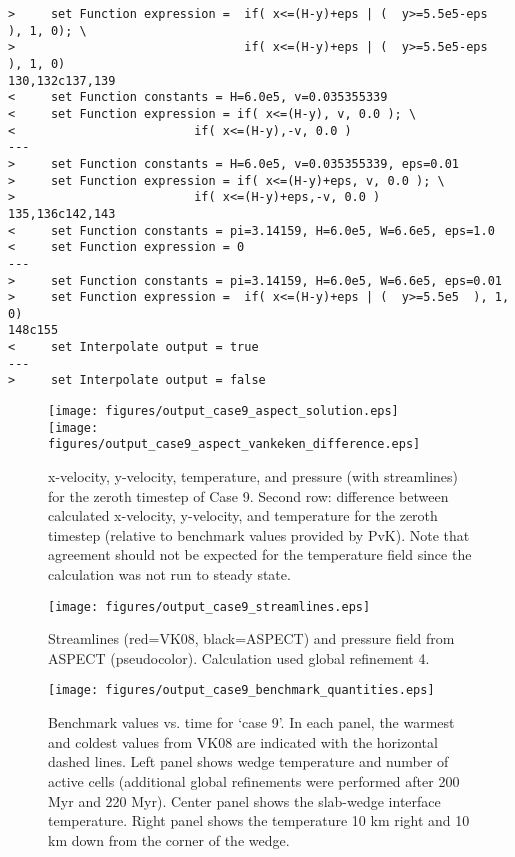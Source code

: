 \documentclass[11pt,letterpaper]{article}
\begin{document}
\begin{verbatim}
>     set Function expression =  if( x<=(H-y)+eps | (  y>=5.5e5-eps  ), 1, 0); \
>                                if( x<=(H-y)+eps | (  y>=5.5e5-eps  ), 1, 0)
130,132c137,139
<     set Function constants = H=6.0e5, v=0.035355339
<     set Function expression = if( x<=(H-y), v, 0.0 ); \
< 	      	              if( x<=(H-y),-v, 0.0 )
---
>     set Function constants = H=6.0e5, v=0.035355339, eps=0.01
>     set Function expression = if( x<=(H-y)+eps, v, 0.0 ); \
> 	      	              if( x<=(H-y)+eps,-v, 0.0 )
135,136c142,143
<     set Function constants = pi=3.14159, H=6.0e5, W=6.6e5, eps=1.0
<     set Function expression = 0
---
>     set Function constants = pi=3.14159, H=6.0e5, W=6.6e5, eps=0.01
>     set Function expression =  if( x<=(H-y)+eps | (  y>=5.5e5  ), 1, 0)
148c155
<     set Interpolate output = true
---
>     set Interpolate output = false
\end{verbatim}
\begin{figure}[!htb]
\texttt{[image: figures/output\_case9\_aspect\_solution.eps]}\\
\texttt{[image: figures/output\_case9\_aspect\_vankeken\_difference.eps]}
\caption{x-velocity, y-velocity, temperature, and pressure (with streamlines) for the zeroth timestep of Case 9. Second row: difference between calculated x-velocity, y-velocity, and temperature for the zeroth timestep (relative to benchmark values provided by PvK). Note that agreement should not be expected for the temperature field since the calculation was not run to steady state.\label{fig:case8a}}
\end{figure}
\begin{figure}[!htb]
\texttt{[image: figures/output\_case9\_streamlines.eps]}
\caption{Streamlines (red=VK08, black=ASPECT) and pressure field from ASPECT (pseudocolor). Calculation used global refinement 4.}
\end{figure}
\begin{figure}[!htb]
\texttt{[image: figures/output\_case9\_benchmark\_quantities.eps]}
\caption{Benchmark values vs. time for `case 9'. In each panel, the warmest and coldest values from VK08 are indicated with the horizontal dashed lines. Left panel shows wedge temperature and number of active cells (additional global refinements were performed after 200 Myr and 220 Myr). Center panel shows the slab-wedge interface temperature. Right panel shows the temperature 10 km right and 10 km down from the corner of the wedge.}
\end{figure}
\end{document}

